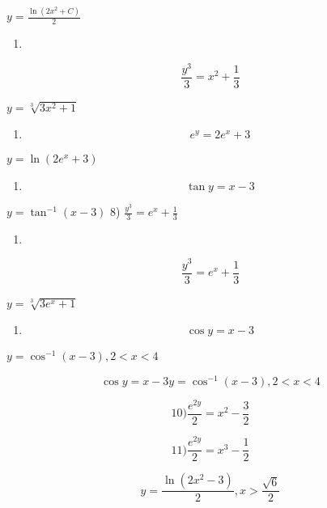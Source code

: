 \documentclass[
]{article}
\providecommand{\tightlist}{%
  \setlength{\itemsep}{0pt}\setlength{\parskip}{0pt}}
\begin{document}
\(y = \frac{\ln(2x^2 + C)}{2}\)

\begin{enumerate}
\def\labelenumi{\arabic{enumi})}
\setcounter{enumi}{4}
\tightlist
\item
\end{enumerate}

\[\frac{y^3}{3} = x^2 + \frac{1}{3}\]

\(y = \sqrt[3]{3x^2 + 1}\)

\begin{enumerate}
\def\labelenumi{\arabic{enumi})}
\setcounter{enumi}{5}
\tightlist
\item
  \[e^y = 2e^x + 3\]
\end{enumerate}

\(y = \ln (2e^x + 3)\)

\begin{enumerate}
\def\labelenumi{\arabic{enumi})}
\setcounter{enumi}{6}
\tightlist
\item
  \[\tan y = x - 3\]
\end{enumerate}

\(y = \tan^{-1}(x - 3)\) 8) \(\frac{y^3}{3} = e^x + \frac{1}{3}\)

\begin{enumerate}
\def\labelenumi{\arabic{enumi})}
\setcounter{enumi}{7}
\tightlist
\item
\end{enumerate}

\[\frac{y^3}{3} = e^x + \frac{1}{3}\]

\(y = \sqrt[3]{3e^x + 1}\)

\begin{enumerate}
\def\labelenumi{\arabic{enumi})}
\setcounter{enumi}{8}
\tightlist
\item
  \[\cos y = x - 3\]
\end{enumerate}

\(y = \cos^{-1}(x - 3), 2 < x < 4\)

\[\cos y = x - 3 y = \cos^{-1}(x - 3), 2 < x < 4\]

\[10) \frac{e^{2y}}{2} = x^2 - \frac{3}{2}\]

\[11) \frac{e^{2y}}{2} = x^3 - \frac{1}{2}\]

\[y = \frac{\ln(2x^2 - 3)}{2}, x > \frac{\sqrt{6}}{2}\]
\end{document}
